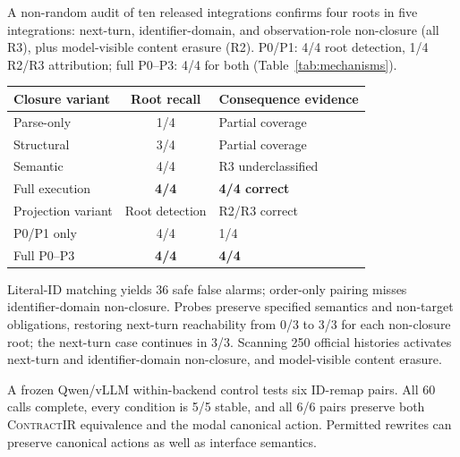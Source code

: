 \documentclass[letterpaper]{article}
\newcommand{\contractir}{\textsc{ContractIR}\xspace}
\begin{document}
A non-random audit of ten released integrations confirms four roots in five
integrations: next-turn, identifier-domain, and observation-role non-closure
(all R3), plus model-visible content erasure (R2). P0/P1: 4/4 root detection,
1/4 R2/R3 attribution; full P0--P3: 4/4 for both (Table~\ref{tab:mechanisms}).

\begingroup\setlength{\topsep}{0pt}\setlength{\partopsep}{0pt}
\begin{center}
\begin{minipage}{\linewidth}
\centering
{}
\label{tab:mechanisms}
\setlength{\tabcolsep}{4pt}
\renewcommand{\arraystretch}{1.04}
\begin{tabular}{@{}lcl@{}}
\toprule
Closure variant & Root recall & Consequence evidence \\
\midrule
Parse-only & 1/4 & Partial coverage \\
Structural & 3/4 & Partial coverage \\
Semantic & 4/4 & R3 underclassified \\
Full execution & \textbf{4/4} & \textbf{4/4 correct} \\
\midrule
Projection variant & Root detection & R2/R3 correct \\
\midrule
P0/P1 only & 4/4 & 1/4 \\
Full P0--P3 & \textbf{4/4} & \textbf{4/4} \\
\bottomrule
\end{tabular}
\end{minipage}
\end{center}
\endgroup

Literal-ID matching yields 36 safe false alarms; order-only pairing misses
identifier-domain non-closure. Probes preserve specified semantics and
non-target obligations, restoring next-turn reachability from 0/3 to 3/3
for each non-closure root; the next-turn case continues in 3/3.
Scanning 250 official histories activates next-turn and identifier-domain
non-closure, and model-visible content erasure.

A frozen Qwen/vLLM within-backend control tests six ID-remap pairs.
All 60 calls complete, every condition is 5/5 stable, and all 6/6 pairs preserve
both \contractir equivalence and the modal canonical action. Permitted rewrites
can preserve canonical actions as well as interface semantics.
\end{document}
